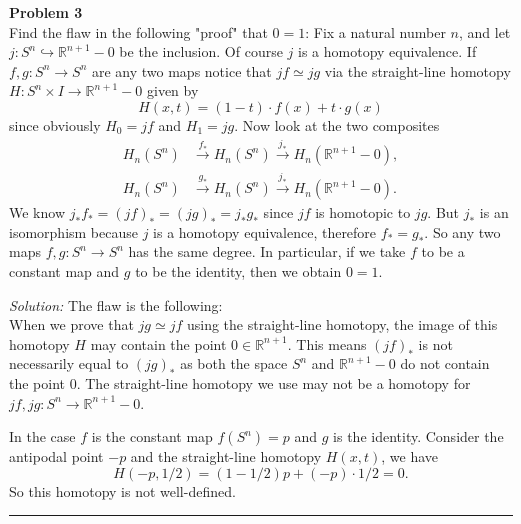 \documentclass[a4paper, 12pt]{article}
\newenvironment{problem}[2][Problem]
    { \begin{mdframed}[backgroundcolor=gray!20] \textbf{#1 #2} \\}
    {  \end{mdframed}}
\newenvironment{solution}
    {\textit{Solution:}}
    {}
\begin{document}
\begin{problem}{3}
Find the flaw in the following "proof" that \(0=1\):
Fix a natural number \(n\), and let \(j:S^n\hookrightarrow \mathbb{R}^{n+1}-0\) be the inclusion. Of course \(j\) is a homotopy equivalence. If \(f,g:S^n\rightarrow S^n\) are any two maps notice that \(jf\simeq jg \) via the straight-line 
homotopy \(H:S^n\times I\rightarrow \mathbb{R}^{n+1}-0\) given by 
\[H(x,t)=(1-t)\cdot f(x)+t\cdot g(x)\]
since obviously \(H_0=jf\) and \(H_1=jg\). Now look at the two composites 
\begin{align*}
    H_n(S^n)&\xrightarrow{f_*}H_n(S^n)\xrightarrow{j_*}H_n(\mathbb{R}^{n+1}-0),\\ 
    H_n(S^n)&\xrightarrow{g_*}H_n(S^n)\xrightarrow{j_*}H_n(\mathbb{R}^{n+1}-0).
\end{align*}
We know \(j_*f_*=(jf)_*=(jg)_*=j_*g_*\) since \(jf\) is homotopic to \(jg\). But \(j_*\) is an isomorphism because \(j\) is a homotopy equivalence, therefore \(f_*=g_*\). So any two maps \(f,g:S^n\rightarrow S^n\) has the same degree. 
In particular, if we take \(f\) to be a constant map and \(g\) to be the identity, then we obtain \(0=1\). 
\end{problem}
\begin{solution}
The flaw is the following:\\ 
When we prove that \(jg\simeq jf\) using the straight-line homotopy, the image of this homotopy \(H\) may contain the point \(0\in \mathbb{R}^{n+1}\). This means \((jf)_*\) is not necessarily equal to \((jg)_*\) as both the space \(S^n\) and 
\(\mathbb{R}^{n+1}-0\) do not contain the point \(0\). The straight-line homotopy we use may not be a homotopy for \(jf,jg:S^n\rightarrow \mathbb{R}^{n+1}-0\).

In the case \(f\) is the constant map \(f(S^n)=p\) and \(g\) is the identity. Consider the antipodal point \(-p\) and the straight-line homotopy \(H(x,t)\), we have 
\[H(-p,1/2)=(1-1/2)p+(-p)\cdot 1/2=0.\]
So this homotopy is not well-defined.
\end{solution}

\noindent\rule{7in}{2.8pt}
\end{document}
